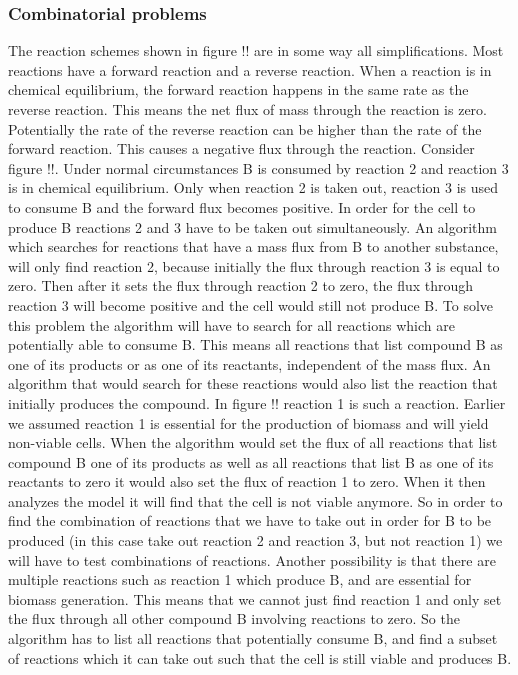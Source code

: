 \documentclass[12pt]{report}
\begin{document}
\subsubsection{Combinatorial problems}
The reaction schemes shown in figure !! are in some way all simplifications. Most reactions have a forward reaction and a reverse reaction. When a reaction is in chemical equilibrium, the forward reaction happens in the same rate as the reverse reaction. This means the net flux of mass through the reaction is zero. Potentially the rate of the reverse reaction can be higher than the rate of the forward reaction. This causes a negative flux through the reaction.
Consider figure !!. Under normal circumstances B is consumed by reaction 2 and reaction 3 is in chemical equilibrium.
Only when reaction 2 is taken out, reaction 3 is used to consume B and the forward flux becomes positive.
In order for the cell to produce B reactions 2 and 3 have to be taken out simultaneously.
An algorithm which searches for reactions that have a mass flux from B to another substance, will only find reaction 2, because initially the flux through reaction 3 is equal to zero. Then after it sets the flux through reaction 2 to zero, the flux through reaction 3 will become positive and the cell would still not produce B. 
To solve this problem the algorithm will have to search for all reactions which are potentially able to consume B. This means all reactions that list compound B as one of its products or as one of its reactants, independent of the mass flux.
An algorithm that would search for these reactions would also list the reaction that initially produces the compound. In figure !! reaction 1 is such a reaction.
Earlier we assumed reaction 1 is essential for the production of biomass and will yield non-viable cells.
When the algorithm would set the flux of all reactions that list compound B one of its products as well as all reactions that list B as one of its reactants to zero it would also set the flux of reaction 1 to zero. When it then analyzes the model it will find that the cell is not viable anymore. So in order to find the combination of reactions that we have to take out in order for B to be produced (in this case take out reaction 2 and reaction 3, but not reaction 1) we will have to test combinations of reactions.
Another possibility is that there are multiple reactions such as reaction 1 which produce B, and are essential for biomass generation.
This means that we cannot just find reaction 1 and only set the flux through all other compound B involving reactions to zero.
So the algorithm has to list all reactions that potentially consume B, and find a subset of reactions which it can take out such that the cell is still viable and produces B.
\end{document}
